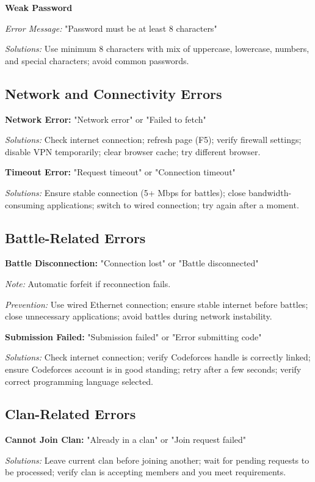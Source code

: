 \documentclass[12pt,a4paper]{article}
\begin{document}
\textbf{Weak Password}

\textit{Error Message:} "Password must be at least 8 characters"

\textit{Solutions:} Use minimum 8 characters with mix of uppercase, lowercase, numbers, and special characters; avoid common passwords.

\subsection{Network and Connectivity Errors}

\textbf{Network Error:} "Network error" or "Failed to fetch"

\textit{Solutions:} Check internet connection; refresh page (F5); verify firewall settings; disable VPN temporarily; clear browser cache; try different browser.

\textbf{Timeout Error:} "Request timeout" or "Connection timeout"

\textit{Solutions:} Ensure stable connection (5+ Mbps for battles); close bandwidth-consuming applications; switch to wired connection; try again after a moment.

\subsection{Battle-Related Errors}

\textbf{Battle Disconnection:} "Connection lost" or "Battle disconnected"

\textit{Note:} Automatic forfeit if reconnection fails.

\textit{Prevention:} Use wired Ethernet connection; ensure stable internet before battles; close unnecessary applications; avoid battles during network instability.

\textbf{Submission Failed:} "Submission failed" or "Error submitting code"

\textit{Solutions:} Check internet connection; verify Codeforces handle is correctly linked; ensure Codeforces account is in good standing; retry after a few seconds; verify correct programming language selected.

\subsection{Clan-Related Errors}

\textbf{Cannot Join Clan:} "Already in a clan" or "Join request failed"

\textit{Solutions:} Leave current clan before joining another; wait for pending requests to be processed; verify clan is accepting members and you meet requirements.
\end{document}
